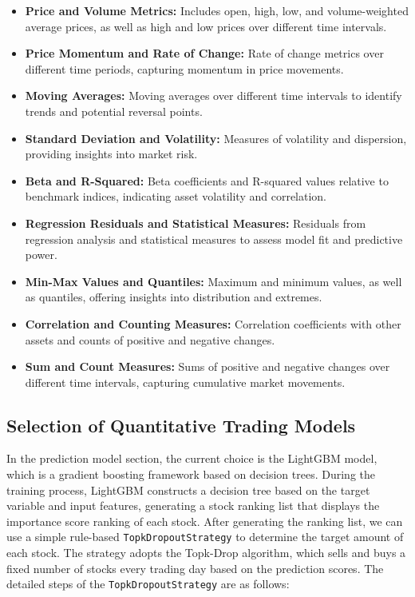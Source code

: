\documentclass[conference]{IEEEtran}
\begin{document}
\begin{itemize}
    \item \textbf{Price and Volume Metrics:} Includes open, high, low, and volume-weighted average prices, as well as high and low prices over different time intervals.
    \item \textbf{Price Momentum and Rate of Change:} Rate of change metrics over different time periods, capturing momentum in price movements.
    \item \textbf{Moving Averages:} Moving averages over different time intervals to identify trends and potential reversal points.
    \item \textbf{Standard Deviation and Volatility:} Measures of volatility and dispersion, providing insights into market risk.
    \item \textbf{Beta and R-Squared:} Beta coefficients and R-squared values relative to benchmark indices, indicating asset volatility and correlation.
    \item \textbf{Regression Residuals and Statistical Measures:} Residuals from regression analysis and statistical measures to assess model fit and predictive power.
    \item \textbf{Min-Max Values and Quantiles:} Maximum and minimum values, as well as quantiles, offering insights into distribution and extremes.
    \item \textbf{Correlation and Counting Measures:} Correlation coefficients with other assets and counts of positive and negative changes.
    \item \textbf{Sum and Count Measures:} Sums of positive and negative changes over different time intervals, capturing cumulative market movements.
\end{itemize}

\subsection{\textbf{Selection of Quantitative Trading Models}}

In the prediction model section, the current choice is the LightGBM model, which is a gradient boosting framework based on decision trees. During the training process, LightGBM constructs a decision tree based on the target variable and input features, generating a stock ranking list that displays the importance score ranking of each stock.
After generating the ranking list, we can use a simple rule-based \texttt{TopkDropoutStrategy} to determine the target amount of each stock. The strategy adopts the Topk-Drop algorithm, which sells and buys a fixed number of stocks every trading day based on the prediction scores. The detailed steps of the \texttt{TopkDropoutStrategy} are as follows:
\end{document}
